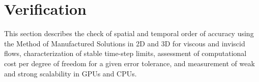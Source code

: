 
\section{Verification}
\label{sec:verification}
This section describes the check of spatial and temporal order of accuracy using the Method of Manufactured Solutions in 2D and 3D for viscous and inviscid flows, characterization of stable time-step limits, assessment of computational cost per degree of freedom for a given error tolerance, and measurement of weak and strong scalability in GPUs and CPUs.



